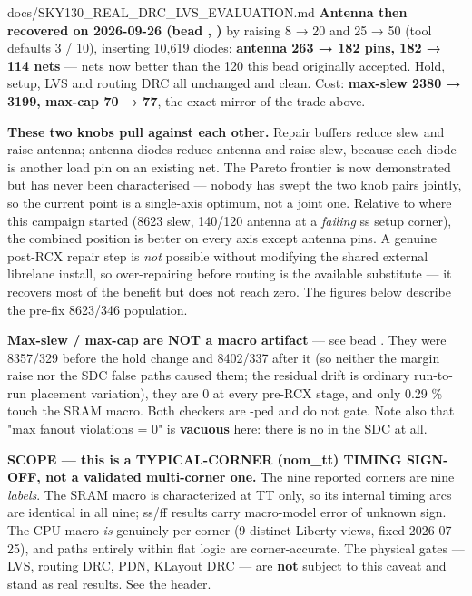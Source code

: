 \begin{relocated}{docs/SKY130_REAL_DRC_LVS_EVALUATION.md}
\textbf{Antenna then recovered on 2026-09-26 (bead ,
)} by raising  8 →
20 and  25 → 50 (tool defaults 3 / 10),
inserting 10,619 diodes: \textbf{antenna 263 → 182 pins, 182 → 114 nets}
--- nets now better than the 120 this bead originally accepted. Hold,
setup, LVS and routing DRC all unchanged and clean. Cost:
\textbf{max-slew 2380 → 3199, max-cap 70 → 77}, the exact mirror of the
trade above.

\warn{} \textbf{These two knobs pull against each other.} Repair buffers
reduce slew and raise antenna; antenna diodes reduce antenna and raise
slew, because each diode is another load pin on an existing net. The
Pareto frontier is now demonstrated but has never been characterised ---
nobody has swept the two knob pairs jointly, so the current point is a
single-axis optimum, not a joint one. Relative to where this campaign
started (8623 slew, 140/120 antenna at a \emph{failing} ss setup
corner), the combined position is better on every axis except antenna
pins. A genuine post-RCX repair step is \emph{not} possible without
modifying the shared external librelane install, so over-repairing
before routing is the available substitute --- it recovers most of the
benefit but does not reach zero. The figures below describe the pre-fix
8623/346 population.

\textbf{Max-slew / max-cap are NOT a macro artifact} --- see bead
. They were 8357/329 before the hold change and 8402/337
after it (so neither the margin raise nor the SDC false paths caused
them; the residual drift is ordinary run-to-run placement variation),
they are 0 at every pre-RCX stage, and only 0.29 \% touch the SRAM
macro. Both checkers are -ped and do not gate. Note also
that "max fanout violations = 0" is \textbf{vacuous} here: there is no
 in the SDC at all.

\textbf{\warn{} SCOPE --- this is a TYPICAL-CORNER (nom\_tt) TIMING
SIGN-OFF, not a validated multi-corner one.} The nine reported corners
are nine \emph{labels}. The SRAM macro
 is characterized at TT only,
so its internal timing arcs are identical in all nine; ss/ff results
carry macro-model error of unknown sign. The CPU macro \emph{is}
genuinely per-corner (9 distinct Liberty views, fixed 2026-07-25), and
paths entirely within flat  logic are
corner-accurate. The physical gates --- LVS, routing DRC, PDN, KLayout
DRC --- are \textbf{not} subject to this caveat and stand as real
results. See the  header.


\end{relocated}
